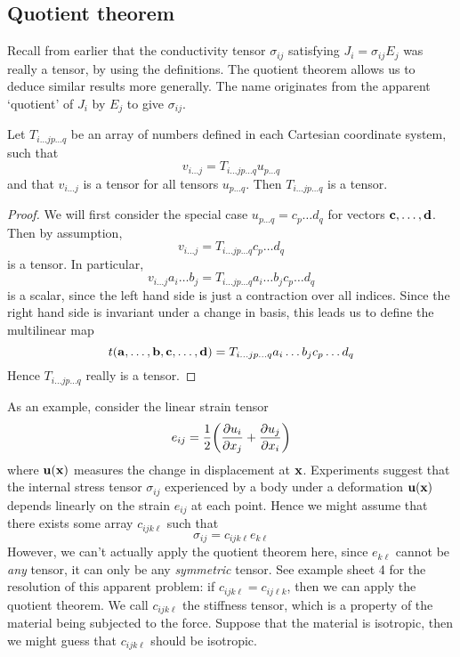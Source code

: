 \subsection{Quotient theorem}
Recall from earlier that the conductivity tensor \(\sigma_{ij}\) satisfying \(J_i = \sigma_{ij} E_j\) was really a tensor, by using the definitions.
The quotient theorem allows us to deduce similar results more generally.
The name originates from the apparent `quotient' of \(J_i\) by \(E_j\) to give \(\sigma_{ij}\).
\begin{proposition}
	Let \(T_{i\dots j p\dots q}\) be an array of numbers defined in each Cartesian coordinate system, such that
	\[
		v_{i\dots j} = T_{i\dots j p \dots q} u_{p\dots q}
	\]
	and that \(v_{i\dots j}\) is a tensor for all tensors \(u_{p\dots q}\).
	Then \(T_{i\dots j p\dots q}\) is a tensor.
\end{proposition}
\begin{proof}
	We will first consider the special case \(u_{p\dots q} = c_p \dots d_q\) for vectors \(\vb c, \dots, \vb d\).
	Then by assumption,
	\[
		v_{i\dots j} = T_{i\dots j p \dots q} c_p \dots d_q
	\]
	is a tensor.
	In particular,
	\[
		v_{i\dots j} a_i \dots b_j = T_{i\dots j p \dots q} a_i \dots b_j c_p \dots d_q
	\]
	is a scalar, since the left hand side is just a contraction over all indices.
	Since the right hand side is invariant under a change in basis, this leads us to define the multilinear map
	\[
		t(\vb a, \dots, \vb b, \vb c, \dots, \vb d) = T_{i\dots j p \dots q} a_i \dots b_j c_p \dots d_q
	\]
	Hence \(T_{i\dots j p \dots q}\) really is a tensor.
\end{proof}
\noindent As an example, consider the linear strain tensor
\[
	e_{ij} = \frac{1}{2}\qty( \pdv{u_i}{x_j} + \pdv{u_j}{x_i} )
\]
where \(\vb u(\vb x)\) measures the change in displacement at \(\vb x\).
Experiments suggest that the internal stress tensor \(\sigma_{ij}\) experienced by a body under a deformation \(\vb u(\vb x)\) depends linearly on the strain \(e_{ij}\) at each point.
Hence we might assume that there exists some array \(c_{ijk\ell}\) such that
\[
	\sigma_{ij} = c_{ijk\ell} e_{k\ell}
\]
However, we can't actually apply the quotient theorem here, since \(e_{k\ell}\) cannot be \textit{any} tensor, it can only be any \textit{symmetric} tensor.
See example sheet 4 for the resolution of this apparent problem: if \(c_{ijk\ell} = c_{ij\ell k}\), then we can apply the quotient theorem.
We call \(c_{ijk\ell}\) the stiffness tensor, which is a property of the material being subjected to the force.
Suppose that the material is isotropic, then we might guess that \(c_{ijk\ell}\) should be isotropic.
